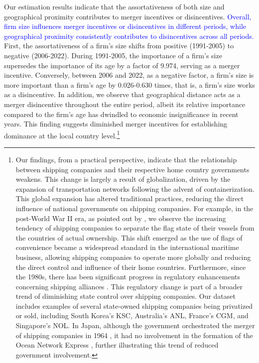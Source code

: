 \documentclass[10pt]{article}
\begin{document}
Our estimation results indicate that the assortativeness of both size and geographical proximity contributes to merger incentives or disincentives. 
\textcolor{blue}{Overall, firm size influences merger incentives or disincentives in different periods, while geographical proximity consistently contributes to disincentives across all periods.}
First, the assortativeness of a firm's size shifts from positive (1991-2005) to negative (2006-2022). 
During 1991-2005, the importance of a firm's size supersedes the importance of its age by a factor of 9.974, serving as a merger incentive.
Conversely, between 2006 and 2022, as a negative factor, a firm's size is more important than a firm's age by 0.026-0.630 times, that is, a firm's size works as a disincentive.
In addition, we observe that geographical distance acts as a merger disincentive throughout the entire period, albeit its relative importance compared to the firm's age has dwindled to economic insignificance in recent years. 
This finding suggests diminished merger incentives for establishing dominance at the local country level.\footnote{Our findings, from a practical perspective, indicate that the relationship between shipping companies and their respective home country governments weakens. This change is largely a result of globalization, driven by the expansion of transportation networks following the advent of containerization. This global expansion has altered traditional practices, reducing the direct influence of national governments on shipping companies. For example, in the post-World War II era, as pointed out by \cite{Heidbrink2012}, we observe the increasing tendency of shipping companies to separate the flag state of their vessels from the countries of actual ownership. This shift emerged as the use of flags of convenience became a widespread standard in the international maritime business, allowing shipping companies to operate more globally and reducing the direct control and influence of their home countries. Furthermore, since the 1980s, there has been significant progress in regulatory enhancements concerning shipping alliances \citep{matsuda2022unified}. This regulatory change is part of a broader trend of diminishing state control over shipping companies. Our dataset includes examples of several state-owned shipping companies being privatized or sold, including South Korea's KSC, Australia's ANL, France's CGM, and Singapore's NOL. In Japan, although the government orchestrated the merger of shipping companies in 1964 \citep{otani2021estimating}, it had no involvement in the formation of the Ocean Network Express \citep{hatano2023}, further illustrating this trend of reduced government involvement.}
\end{document}
